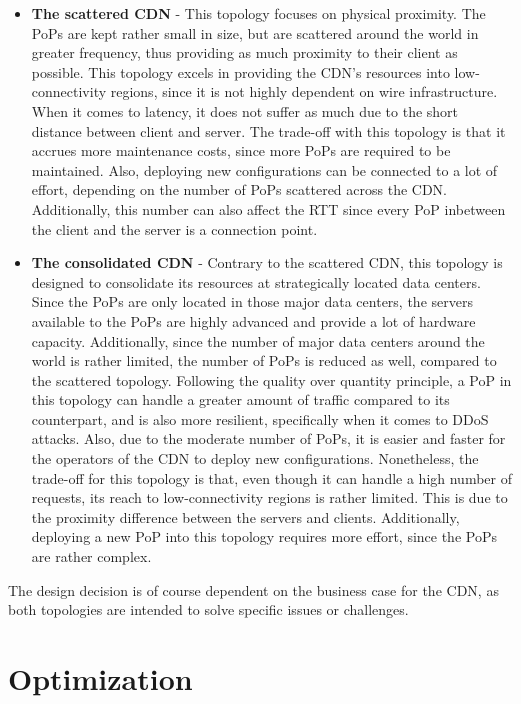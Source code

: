 \begin{itemize}
	\item \textbf{The scattered CDN} - This topology focuses on physical proximity. The PoPs are kept rather small in size, but are scattered around the world in greater frequency, thus providing as much proximity to their client as possible. This topology excels in providing the CDN's resources into low-connectivity regions, since it is not highly dependent on wire infrastructure. When it comes to latency, it does not suffer as much due to the short distance between client and server. The trade-off with this topology is that it accrues more maintenance costs, since more PoPs are required to be maintained. Also, deploying new configurations can be connected to a lot of effort, depending on the number of PoPs scattered across the CDN. 
	Additionally, this number can also affect the RTT since every PoP inbetween the client and the server is a connection point.
	
	\item \textbf{The consolidated CDN} - Contrary to the scattered CDN, this topology is designed to consolidate its resources at strategically located data centers. Since the PoPs are only located in those major data centers, the servers available to the PoPs are highly advanced and provide a lot of hardware capacity. Additionally, since the number of major data centers around the world is rather limited, the number of PoPs is reduced as well, compared to the scattered topology. Following the quality over quantity principle, a PoP in this topology can handle a greater amount of traffic compared to its counterpart, and is also more resilient, specifically when it comes to DDoS attacks. Also, due to the moderate number of PoPs, it is easier and faster for the operators of the CDN to deploy new configurations.
	Nonetheless, the trade-off for this topology is that, even though it can handle a high number of requests, its reach to low-connectivity regions is rather limited. This is due to the proximity difference between the servers and clients. Additionally, deploying a new PoP into this topology requires more effort, since the PoPs are rather complex.	
\end{itemize}

The design decision is of course dependent on the business case for the CDN, as both topologies are intended to solve specific issues or challenges. \cite{cdn_architecture} 

\section{Optimization}

